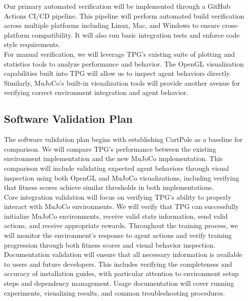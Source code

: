 \documentclass[12pt, titlepage]{article}
\begin{document}
Our primary automated verification will be implemented through a GitHub Actions CI/CD pipeline. This pipeline will perform automated build verification across multiple platforms including Linux, Mac, and Windows to ensure cross-platform compatibility. It will also run basic integration tests and enforce code style requirements. \\

For manual verification, we will leverage TPG's existing suite of plotting and statistics tools to analyze performance and behavior. The OpenGL visualization capabilities built into TPG will allow us to inspect agent behaviors directly. Similarly, MuJoCo's built-in visualization tools will provide another avenue for verifying correct environment integration and agent behavior.

\subsection{Software Validation Plan}

The software validation plan begins with establishing CartPole as a baseline for comparison. We will compare TPG's performance between the existing environment implementation and the new MuJoCo implementation. This comparison will include validating expected agent behaviors through visual inspection using both OpenGL and MuJoCo visualizations, including verifying that fitness scores achieve similar thresholds in both implementations. \\

Core integration validation will focus on verifying TPG's ability to properly interact with MuJoCo environments. We will verify that TPG can successfully initialize MuJoCo environments, receive valid state information, send valid actions, and receive appropriate rewards. Throughout the training process, we will monitor the environment's response to agent actions and verify training progression through both fitness scores and visual behavior inspection. \\

Documentation validation will ensure that all necessary information is available to users and future developers. This includes verifying the completeness and accuracy of installation guides, with particular attention to environment setup steps and dependency management. Usage documentation will cover running experiments, visualizing results, and common troubleshooting procedures. \\
\end{document}
